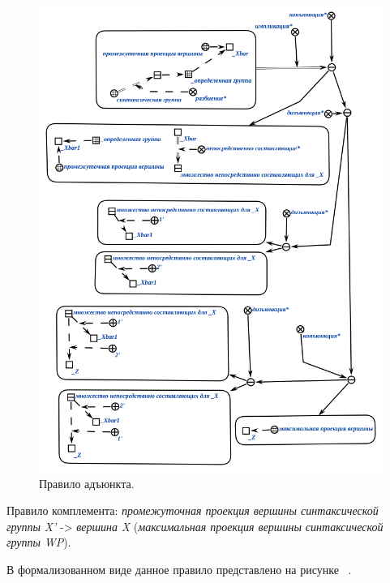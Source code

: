 \begin{figure}[h]
    \centering
    \includegraphics[scale=0.8]{images/part2/chapter_lang/adjunct_rule}
    \caption{Правило адъюнкта.}
    \label{fig:adjunct_rule}
\end{figure}

Правило комплемента: \textit{промежуточная проекция вершины синтаксической группы}  \textit{X'} -> \textit{вершина} \textit{X} (\textit{максимальная проекция вершины синтаксической группы} \textit{WP}).

В формализованном виде данное правило представлено на рисунке ~\textit{}.


